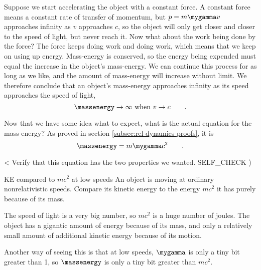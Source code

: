 Suppose we start accelerating the object with a constant force. A constant force means a constant
rate of transfer of momentum, but $p=m\mygamma v$ approaches infinity as $v$ approaches $c$, so the object
will only get closer and closer to the speed of light, but never reach it. Now what about the work being
done by the force? The force keeps doing work and doing work, which means that we keep on using up
energy. Mass-energy is conserved, so the energy being expended must equal the increase in the object's
mass-energy. We can continue this process for as long as we like, and the amount of mass-energy
will increase without limit. We therefore conclude that an object's mass-energy approaches infinity
as its speed approaches the speed of light,
\begin{equation*}
  \massenergy \rightarrow \infty\ \text{when}\ v \rightarrow c \qquad .
\end{equation*}

Now that we have some idea what to expect, what is the actual equation for the mass-energy? 
As proved in section \ref{subsec:rel-dynamics-proofs}, it is
\begin{equation*}
  \massenergy =m\mygamma c^2 \qquad .
\end{equation*}

<%
Verify that this equation has the two properties we wanted.
  SELF_CHECK
  ) %

\begin{eg}{KE compared to $mc^2$ at low speeds}\label{eg:massenergy-low-speed}
\egquestion An object is moving at ordinary nonrelativistic speeds. Compare its
kinetic energy to the energy $mc^2$ it has purely because of its mass.

\eganswer The speed of light is a very big number, so $mc^2$ is a huge number of
joules. The object has a gigantic amount of energy because of its mass, and only
a relatively small amount of additional kinetic energy because of its motion.

Another way of seeing this is that at low speeds, $\mygamma$ is only a tiny bit
greater than 1, so $\massenergy$ is only a tiny bit greater than $mc^2$.
\end{eg}

